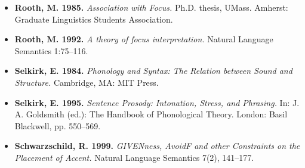 \documentclass[a4paper, titlepage, 12pt]{article}
\begin{document}
\begin{itemize}

    
    \item[] \textbf{Rooth, M. 1985.} \textit{Association with Focus.} Ph.D. thesis, UMass. Amherst: Graduate Linguistics Students Association.

    \item[]  \textbf{Rooth, M. 1992.} \textit{A theory of focus interpretation.} Natural Language Semantics 1:75–116. 

    \item[] \textbf{Selkirk, E. 1984.} \textit{Phonology and Syntax: The Relation between Sound and Structure.} Cambridge, MA: MIT Press.

    \item[] \textbf{Selkirk, E. 1995.} \textit{Sentence Prosody: Intonation, Stress, and Phrasing.} In: J. A. Goldsmith (ed.): The Handbook of Phonological Theory. London: Basil Blackwell, pp. 550–569.

    \item[] \textbf{Schwarzschild, R. 1999.} \textit{GIVENness, AvoidF and other Constraints on the Placement of Accent.} Natural Language Semantics 7(2), 141–177.

\end{itemize}
\end{document}
